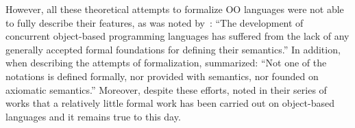 However, all these theoretical attempts to formalize OO languages
were not able to fully describe their features, as was noted
by~\citet{nierstrasz1991towards}:
``The development of concurrent object-based programming languages
has suffered from the lack of any generally accepted formal
foundations for defining their semantics.'' In addition, when describing the
attempts of formalization, \citet{eden2002visual} summarized: ``Not one of the
notations is defined formally, nor provided with
 semantics,
nor founded on axiomatic semantics.''
%
Moreover, despite these efforts,
\citet{ciaffaglione2003reasoning,ciaffaglione2003typetheories,ciaffaglione2007theory_of_contexts}
noted in their series of works that a relatively little formal work has
been carried out on object-based languages and it remains true to this day.
